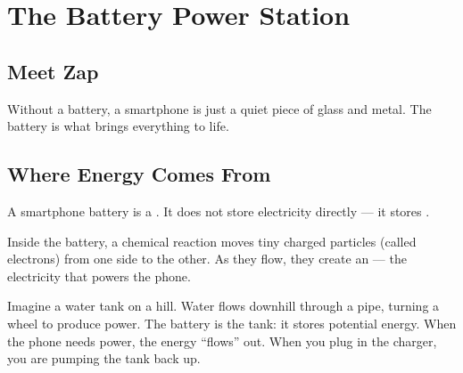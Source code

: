
\chapter{The Battery Power Station}


\section*{Meet Zap}


Without a battery, a smartphone is just a quiet piece of glass and metal.
The battery is what brings everything to life.

\sectionrule

\section*{Where Energy Comes From}

A smartphone battery is a .
It does not store electricity directly — it stores .

Inside the battery, a chemical reaction moves tiny charged particles
(called electrons) from one side to the other.
As they flow, they create an  — the electricity that powers the phone.

\begin{picturethis}
  Imagine a water tank on a hill.
  Water flows downhill through a pipe, turning a wheel to produce power.
  The battery is the tank: it stores potential energy.
  When the phone needs power, the energy ``flows'' out.
  When you plug in the charger, you are pumping the tank back up.
\end{picturethis}

